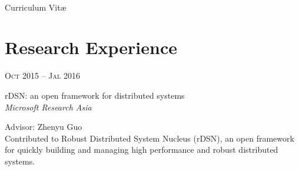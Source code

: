\documentclass[10pt]{article} %
\begin{document}
\color{text1} %


\par{\\ %
{\color{headings} Curriculum {Vit\ae}\\[15pt]\par} %
	

\begin{minipage}[t]{0.5\textwidth} %
\vspace{0pt} %
	

\section{Research Experience} 


{\raggedleft\textsc{Oct 2015 -- Jal 2016}\par}

{\raggedright\large rDSN:  an open framework for distributed systems\\
\textit{{\color{stress}Microsoft Research} Asia }\\[5pt]
}

Advisor: Zhenyu Guo\\
\normalsize{Contributed to Robust Distributed System Nucleus (rDSN), an open framework for quickly building and managing high performance and robust distributed systems.  }\\





\end{minipage}}
\end{document}
